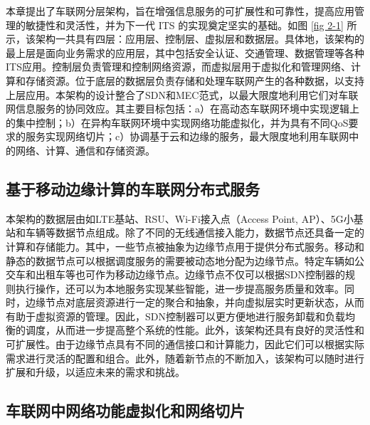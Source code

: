 本章提出了车联网分层架构，旨在增强信息服务的可扩展性和可靠性，提高应用管理的敏捷性和灵活性，并为下一代 ITS 的实现奠定坚实的基础。如图 \ref{fig 2-1} 所示，该架构一共具有四层：应用层、控制层、虚拟层和数据层。具体地，该架构的最上层是面向业务需求的应用层，其中包括安全认证、交通管理、数据管理等各种ITS应用。控制层负责管理和控制网络资源，而虚拟层用于虚拟化和管理网络、计算和存储资源。位于底层的数据层负责存储和处理车联网产生的各种数据，以支持上层应用。本架构的设计整合了SDN和MEC范式，以最大限度地利用它们对车联网信息服务的协同效应。其主要目标包括：a）在高动态车联网环境中实现逻辑上的集中控制；b）在异构车联网环境中实现网络功能虚拟化，并为具有不同QoS要求的服务实现网络切片；c）协调基于云和边缘的服务，最大限度地利用车联网中的网络、计算、通信和存储资源。

\subsection{基于移动边缘计算的车联网分布式服务}

本架构的数据层由如LTE基站、RSU、Wi-Fi接入点（Access Point, AP）、5G小基站和车辆等数据节点组成。除了不同的无线通信接入能力，数据节点还具备一定的计算和存储能力。其中，一些节点被抽象为边缘节点用于提供分布式服务。移动和静态的数据节点可以根据调度服务的需要被动态地分配为边缘节点。特定车辆如公交车和出租车等也可作为移动边缘节点。边缘节点不仅可以根据SDN控制器的规则执行操作，还可以为本地服务实现某些智能，进一步提高服务质量和效率。同时，边缘节点对底层资源进行一定的聚合和抽象，并向虚拟层实时更新状态，从而有助于虚拟资源的管理。因此，SDN控制器可以更方便地进行服务卸载和负载均衡的调度，从而进一步提高整个系统的性能。此外，该架构还具有良好的灵活性和可扩展性。由于边缘节点具有不同的通信接口和计算能力，因此它们可以根据实际需求进行灵活的配置和组合。此外，随着新节点的不断加入，该架构可以随时进行扩展和升级，以适应未来的需求和挑战。

\subsection{车联网中网络功能虚拟化和网络切片}

